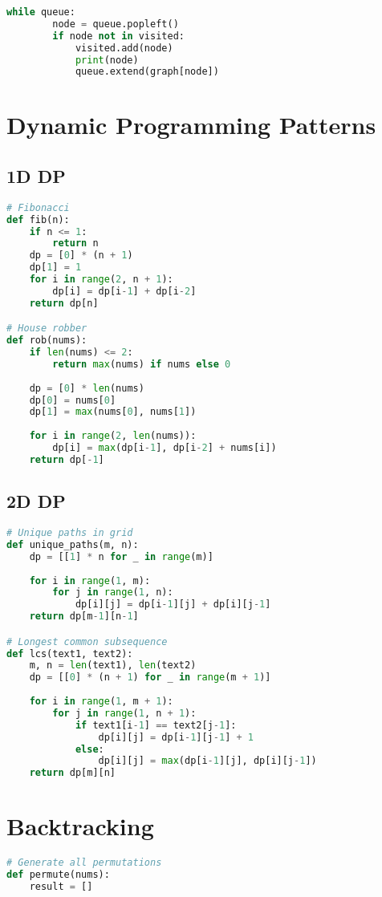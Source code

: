 \documentclass[9pt,a4paper]{article}
\begin{document}
\begin{multicols}{2}
\begin{lstlisting}[language=Python]
    while queue:
        node = queue.popleft()
        if node not in visited:
            visited.add(node)
            print(node)
            queue.extend(graph[node])
\end{lstlisting}

\section*{Dynamic Programming Patterns}

\subsection*{1D DP}
\begin{lstlisting}[language=Python]
# Fibonacci
def fib(n):
    if n <= 1:
        return n
    dp = [0] * (n + 1)
    dp[1] = 1
    for i in range(2, n + 1):
        dp[i] = dp[i-1] + dp[i-2]
    return dp[n]

# House robber
def rob(nums):
    if len(nums) <= 2:
        return max(nums) if nums else 0
    
    dp = [0] * len(nums)
    dp[0] = nums[0]
    dp[1] = max(nums[0], nums[1])
    
    for i in range(2, len(nums)):
        dp[i] = max(dp[i-1], dp[i-2] + nums[i])
    return dp[-1]
\end{lstlisting}

\subsection*{2D DP}
\begin{lstlisting}[language=Python]
# Unique paths in grid
def unique_paths(m, n):
    dp = [[1] * n for _ in range(m)]
    
    for i in range(1, m):
        for j in range(1, n):
            dp[i][j] = dp[i-1][j] + dp[i][j-1]
    return dp[m-1][n-1]

# Longest common subsequence
def lcs(text1, text2):
    m, n = len(text1), len(text2)
    dp = [[0] * (n + 1) for _ in range(m + 1)]
    
    for i in range(1, m + 1):
        for j in range(1, n + 1):
            if text1[i-1] == text2[j-1]:
                dp[i][j] = dp[i-1][j-1] + 1
            else:
                dp[i][j] = max(dp[i-1][j], dp[i][j-1])
    return dp[m][n]
\end{lstlisting}

\section*{Backtracking}
\begin{lstlisting}[language=Python]
# Generate all permutations
def permute(nums):
    result = []
    

\end{lstlisting}
\end{multicols}
\end{document}
